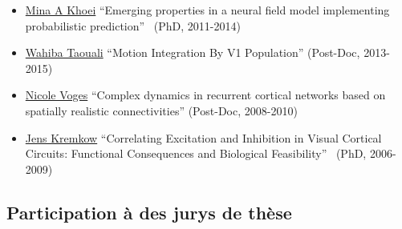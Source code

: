 \documentclass[10pt,french,a4paper,oneside]{article}%
\begin{document}
\begin{itemize}
	\item \href{https://laurentperrinet.github.io/author/mina-a-khoei/}{Mina A Khoei} 	``Emerging properties in a neural field model implementing probabilistic prediction''~\textcite{Khoei14thesis} (PhD, 2011-2014)
	\item \href{https://laurentperrinet.github.io/author/wahiba-taouali/}{Wahiba Taouali} 	``Motion Integration By V1 Population'' (Post-Doc, 2013-2015)
	\item \href{https://laurentperrinet.github.io/author/nicole-voges/}{Nicole Voges} 	``Complex dynamics in recurrent cortical networks based on spatially realistic connectivities'' (Post-Doc, 2008-2010)
	\item \href{https://laurentperrinet.github.io/author/jens-kremkow/}{Jens Kremkow} ``Correlating Excitation and Inhibition in Visual Cortical Circuits: Functional Consequences and Biological Feasibility''~\citep{Kremkow09thesis} (PhD, 2006-2009)
\end{itemize}

\subsection{Participation à des jurys de thèse} %
\end{document}
